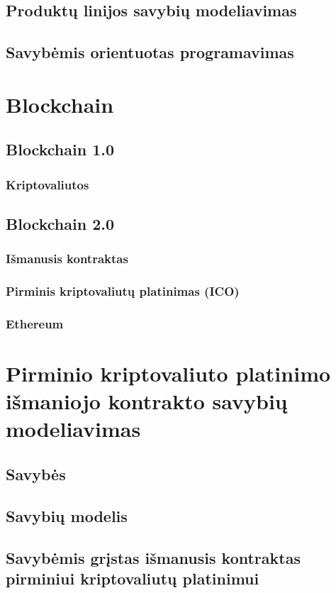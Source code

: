 \documentclass{VUMIFInfKursinis}
\begin{document}
\subsection{Produktų linijos savybių modeliavimas}
\subsection{Savybėmis orientuotas programavimas}
\section{Blockchain}
\subsection{Blockchain 1.0}
\subsubsection{Kriptovaliutos}
\subsection{Blockchain 2.0}
\subsubsection{Išmanusis kontraktas}
\subsubsection{Pirminis kriptovaliutų platinimas (ICO)}
\subsubsection{Ethereum}
\section{Pirminio kriptovaliuto platinimo išmaniojo kontrakto savybių modeliavimas}
\subsection{Savybės}
\subsection{Savybių modelis}
\subsection{Savybėmis grįstas išmanusis kontraktas pirminiui kriptovaliutų platinimui}
\end{document}
